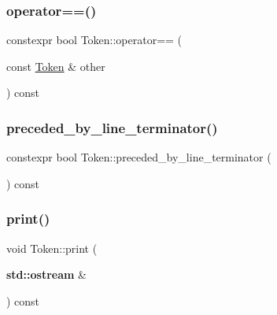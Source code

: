 \subsubsection{\texorpdfstring{operator==()}{operator==()}\hspace{0.1cm}{\footnotesize\ttfamily [2/2]}}
{\footnotesize\ttfamily constexpr bool Token\+::operator== (\begin{DoxyParamCaption}\item[{const \hyperlink{class_token}{Token} \&}]{other }\end{DoxyParamCaption}) const\hspace{0.3cm}{\ttfamily [inline]}}

\mbox{\label{class_token_aec736aba84de102878db8605f8574e38}} 
\subsubsection{\texorpdfstring{preceded\+\_\+by\+\_\+line\+\_\+terminator()}{preceded\_by\_line\_terminator()}}
{\footnotesize\ttfamily constexpr bool Token\+::preceded\+\_\+by\+\_\+line\+\_\+terminator (\begin{DoxyParamCaption}{ }\end{DoxyParamCaption}) const\hspace{0.3cm}{\ttfamily [inline]}}

\mbox{\label{class_token_a50f3ddd1f75c6ae38e0156dd16796a9e}} 
\subsubsection{\texorpdfstring{print()}{print()}\hspace{0.1cm}{\footnotesize\ttfamily [1/2]}}
{\footnotesize\ttfamily void Token\+::print (\begin{DoxyParamCaption}\item[{\textbf{ std\+::ostream} \&}]{ }\end{DoxyParamCaption}) const}

\mbox{\label{class_token_ae3e466fdaf072ec89d2c4bf78b91d5e9}} 
